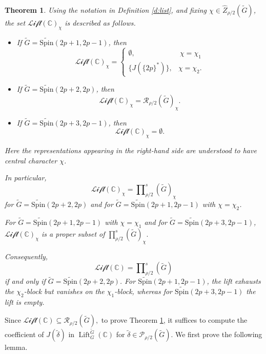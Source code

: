 \documentclass{amsart}
\DeclareMathOperator{\Lift}{Lift}
\newcommand{\LLift}{\mathscr{Lift}}
\newcommand{\bbC}{{\mathbb{C}}}
\newcommand{\Spin}{{\mathrm{Spin}}}
\newtheorem{thm}{Theorem}[section]
\theoremstyle{definition}
\newcommand{\calR}{{\mathcal{R}}}
\newcommand{\tu}{\widetilde}
\begin{document}
\begin{thm}\label{t:main}
Using the notation in Definition \ref{d:list}, and fixing
$\chi\in \widehat Z_{\rho/2}(\tu G)$, the set $\LLift(\bbC)_\chi$ is described
as follows.
\begin{itemize}
    \item[(a)] If $\tu G=\tu{\Spin}(2p+1,2p-1)$, then
    \[
    \LLift(\bbC)_\chi
    =\begin{cases}
        \emptyset, & \ \chi =\chi_1\\
    \{J(\{2p\}^*)\}, & \chi=\chi_2.
    \end{cases}
    \]

    \item[(b)] If $\tu G=\tu{\Spin}(2p+2,2p)$, then
    \[
    \LLift(\bbC)_\chi
    =
    \calR_{\rho/2}(\tu G)_\chi.
    \]

    \item[(c)] If $\tu G=\tu{\Spin}(2p+3,2p-1)$, then
    \[
    \LLift(\bbC)_\chi
    =
    \emptyset.
    \]
\end{itemize}
Here the representations appearing in the right-hand side are understood to
have central character $\chi$.

In particular, 
\[
\LLift(\bbC)_\chi
=
\prod\nolimits_{\rho/2}^{s}(\tu G)_\chi
\]
for  $\tu G=\tu{\Spin}(2p+2,2p)$ and for $\tu G=\tu\Spin (2p+1,2p-1)$ with $\chi=\chi_2$. 

For $\tu G=\tu\Spin (2p+1,2p-1)$ with $\chi=\chi_1$ and for
$\tu G=\tu\Spin(2p+3,2p-1)$,
$\LLift(\bbC)_\chi$ is a proper subset of
$\prod\nolimits_{\rho/2}^{s}(\tu G)_\chi.$

Consequently,
\[
\LLift(\bbC)
=
\prod\nolimits_{\rho/2}^{s}(\widetilde G)
\]
if and only if
\(\widetilde G=\widetilde{\Spin}(2p+2,2p)\).
For \(\widetilde{\Spin}(2p+1,2p-1)\), the lift exhausts the
\(\chi_2\)-block but vanishes on the \(\chi_1\)-block, whereas for
\(\widetilde{\Spin}(2p+3,2p-1)\) the lift is empty.

\end{thm}


Since
$\LLift(\bbC)\subseteq \mathcal R_{\rho/2}(\tu G),$
to prove Theorem \ref{t:main}, it suffices to compute the coefficient of
$J(\tu\delta)$ in $\Lift_G^{\tu G}(\bbC)$ for
$\tu\delta\in \mathcal P_{\rho/2}(\tu G)$.
We first prove the following lemma.
\end{document}
